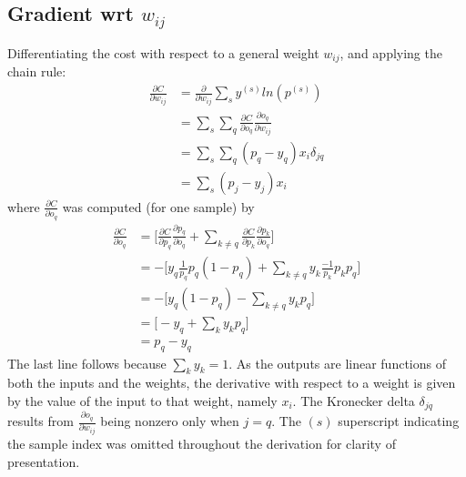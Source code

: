 \documentclass{article}
\begin{document}
   \subsection{Gradient wrt $w_{ij}$}
   Differentiating the cost with respect to a general weight $w_{ij}$, and applying
   the chain rule:
      \begin{equation*} \begin{split}
        \frac{ \partial C}{ \partial w_{ij} }
           &= \frac{ \partial }{ \partial w_{ij} } \sum_{s} y^{(s)} ln(p^{(s)}) \\
           &= \sum_s \sum_q  \frac{ \partial C}{ \partial o_q } \frac{ \partial o_q }{ \partial w_{ij} } \\
           &= \sum_s \sum_q ( p_q - y_q ) x_i \delta_{jq}  \\
           &= \sum_s ( p_j - y_j ) x_i
      \end{split} \end{equation*}
   where $ \frac{ \partial C}{ \partial o_q } $ was computed (for one sample) by
      \begin{equation*} \begin{split}
        \frac{ \partial C}{ \partial o_q }
           &= \bigg[   \frac{ \partial C}{ \partial p_q } \frac{ \partial p_q}{ \partial o_q }    +   \sum_{k \neq q} \frac{ \partial C}{ \partial p_k } \frac{ \partial p_k}{ \partial o_q }  \bigg]  \\
           &= - \bigg[    y_q \frac{1}{p_q} p_q (1 - p_q)  +   \sum_{k \neq q} y_k \frac{-1}{p_k} p_k p_q  \bigg]  \\
           &= - \bigg[    y_q (1 - p_q)  -  \sum_{k \neq q} y_k p_q       \bigg]   \\
           &=   \bigg[    - y_q  +  \sum_k y_k p_q   \bigg]  \\
           &=  p_q - y_q
      \end{split} \end{equation*}
   The last line follows because $\sum_k y_k = 1$.
   As the outputs are linear functions of both the inputs and the weights, the derivative
   with respect to a weight is given by the value of the input to that weight, namely $x_i$.
   The Kronecker delta $\delta_{jq}$ results from $ \frac{ \partial o_q }{ \partial w_{ij} } $
   being nonzero only when $j = q$.
   The $(s)$ superscript indicating the sample index was omitted throughout the derivation for clarity of presentation.
\end{document}
